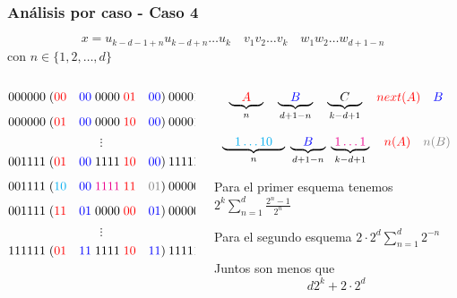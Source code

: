 \documentclass[10pt,mathserif]{beamer}%
\begin{document}
\begin{frame}
  \frametitle{Análisis por caso - Caso 4}
  $$ x = u_{k-d-1+n} u_{k-d+n} \dots u_k \quad v_1 v_2 \dots v_k \quad w_1 w_2 \dots w_{d+1-n} $$
  con $n \in \{1, 2, \dots , d\}$
  \begin{columns}
    \begin{column}{0.5\textwidth}

        $$000000\; (\textcolor{red}{00} \quad \textcolor{blue}{00} \; 0000 \; \textcolor{red}{01} \quad \textcolor{blue}{00}) \: 000010$$
        $$000000\; (\textcolor{red}{01} \quad \textcolor{blue}{00} \; 0000 \; \textcolor{red}{10} \quad \textcolor{blue}{00}) \: 000011$$
        $$\vdots$$
        $$001111\; (\textcolor{red}{01} \quad \textcolor{blue}{00} \; 1111 \; \textcolor{red}{10} \quad \textcolor{blue}{00}) \: 111111$$
        $$001111\; (\textcolor{cyan}{10} \quad \textcolor{blue}{00} \; \textcolor{magenta}{1111} \; \textcolor{red}{11} \quad \textcolor{gray}{01}) \: 000000$$
        $$001111\; (\textcolor{red}{11} \quad \textcolor{blue}{01} \; 0000 \; \textcolor{red}{00} \quad \textcolor{blue}{01}) \: 000001$$
        $$\vdots$$
        $$111111\; (\textcolor{red}{01} \quad \textcolor{blue}{11} \; 1111 \; \textcolor{red}{10} \quad \textcolor{blue}{11}) \: 111111$$
    \end{column}
    \begin{column}{0.5\textwidth}  %
      \pause
      \begin{footnotesize}
        $$\underbrace{\quad \textcolor{red}{A} \quad }_{n} \quad \underbrace{\quad \textcolor{blue}{B} \quad }_{d + 1 - n}  \quad \underbrace{\quad C \quad }_{k-d+1} \quad \textcolor{red}{next(A)} \quad \textcolor{blue}{B}$$

        $$\underbrace{\quad \textcolor{cyan}{1\dots10} \quad }_{n} \; \underbrace{\quad \textcolor{blue}{B} \quad }_{d + 1 - n}  \; \underbrace{\; \textcolor{magenta}{1\dots1} \; }_{k-d+1} \quad \textcolor{red}{n(A)} \quad \textcolor{gray}{n(B)}$$
        
        Para el primer esquema tenemos $2^k \sum_{n=1}^{d} \frac{2^n - 1}{2^n}$

        Para el segundo esquema $ 2 \cdot 2^d \sum_{n=1}^{d} 2^{- n}$

        Juntos son menos que 
        $$d2^k + 2 \cdot 2^d$$
      \end{footnotesize}
    \end{column}
    \end{columns}
\end{frame}
\end{document}
